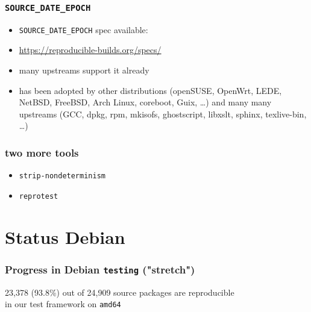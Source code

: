 \documentclass[14pt,aspectratio=169]{beamer}
\newif\ifplacelogo
\begin{document}
\begin{frame}
 \frametitle{\texttt{SOURCE\_DATE\_EPOCH}}

 \begin{itemize}
  \item \texttt{SOURCE\_DATE\_EPOCH} spec available:
  \item \url{https://reproducible-builds.org/specs/}
  \item many upstreams support it already
  \item has been adopted by other distributions
  (openSUSE, OpenWrt, LEDE, NetBSD, FreeBSD, Arch Linux, coreboot, Guix, …) and many many
  upstreams (GCC, dpkg, rpm, mkisofs, ghostscript, libxslt, sphinx,
  texlive-bin, …)
 \end{itemize}
\end{frame}

\begin{frame}
 \frametitle{two more tools}

 \begin{itemize}
  \item \texttt{strip-nondeterminism} 
  \item<2> \texttt{reprotest} 
 \end{itemize}
\end{frame}

\placelogotrue

\section{Status Debian}

\begin{frame}
 \frametitle{Progress in Debian \texttt{testing} ("stretch")}
 \begin{center}
  \footnotesize{23,378 (93.8\%) out of 24,909 source packages are reproducible \\
    in our test framework on \texttt{amd64}}
  \vfill
 \end{center}
\end{frame}
\end{document}
